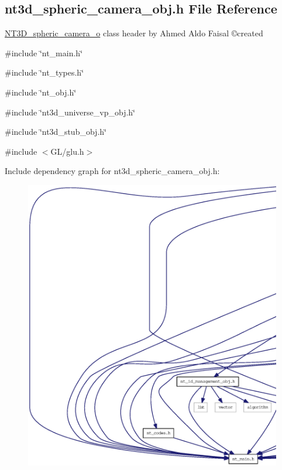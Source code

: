 \subsection{nt3d\_\-spheric\_\-camera\_\-obj.h File Reference}
\label{nt3d__spheric__camera__obj_8h}



\begin{DoxyItemize}
\item \hyperlink{class_n_t3_d__spheric__camera__o}{NT3D\_\-spheric\_\-camera\_\-o} class header by Ahmed Aldo Faisal \copyright created 
\end{DoxyItemize} 


{\ttfamily \#include \char`\"{}nt\_\-main.h\char`\"{}}\par
{\ttfamily \#include \char`\"{}nt\_\-types.h\char`\"{}}\par
{\ttfamily \#include \char`\"{}nt\_\-obj.h\char`\"{}}\par
{\ttfamily \#include \char`\"{}nt3d\_\-universe\_\-vp\_\-obj.h\char`\"{}}\par
{\ttfamily \#include \char`\"{}nt3d\_\-stub\_\-obj.h\char`\"{}}\par
{\ttfamily \#include $<$GL/glu.h$>$}\par
Include dependency graph for nt3d\_\-spheric\_\-camera\_\-obj.h:
\nopagebreak
\begin{figure}[H]
\begin{center}
\leavevmode
\includegraphics[width=400pt]{nt3d__spheric__camera__obj_8h__incl}
\end{center}
\end{figure}
